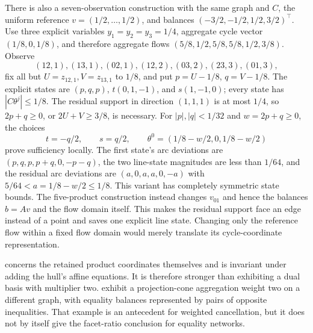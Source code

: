 \begin{remark}\label{rem:seven-product-k4}
There is also a seven-observation construction with the same graph and
$C$, the uniform reference $v=(1/2,\ldots,1/2)$, and balances
$(-3/2,-1/2,1/2,3/2)^\top$. Use three explicit variables
$y_1=y_2=y_3=1/4$, aggregate cycle vector $(1/8,0,1/8)$, and therefore
aggregate flows $(5/8,1/2,5/8,5/8,1/2,3/8)$. Observe
\[
 (12,1),(13,1),(02,1),(12,2),(03,2),(23,3),(01,3),
\]
fix all but $U=z_{12,1},V=z_{13,1}$ to $1/8$, and put
$p=U-1/8$, $q=V-1/8$. The explicit states are
$(p,q,p)$, $t(0,1,-1)$, and $s(1,-1,0)$; every state has
$|C\theta^j|\le1/8$. The residual support in direction $(1,1,1)$
is at most $1/4$, so $2p+q\ge0$, or $2U+V\ge3/8$, is necessary.
For $|p|,|q|<1/32$ and $w=2p+q\ge0$, the choices
\[
 t=-q/2,\qquad s=q/2,\qquad
 \theta^0=(1/8-w/2,0,1/8-w/2)
\]
prove sufficiency locally. The first state's arc deviations are
$(p,q,p,p+q,0,-p-q)$, the two line-state magnitudes are less than
$1/64$, and the residual arc deviations are $(a,0,a,a,0,-a)$ with
$5/64<a=1/8-w/2\le1/8$. This variant has completely symmetric state
bounds. The five-product construction instead changes $v_{01}$ and hence
the balances $b=Av$ and the flow domain itself. This makes the residual
support face an edge instead of a point and saves one explicit line state.
Changing only the reference flow within a fixed flow domain would merely
translate its cycle-coordinate representation.
\end{remark}

 concerns the retained product coordinates
themselves and is invariant under adding the hull's affine equations. It
is therefore stronger than exhibiting a dual basis with multiplier two.
\citet[Example~2]{KhademniaDavarnia2025} exhibit a projection-cone
aggregation weight two on a different graph, with equality balances
represented by pairs of opposite inequalities. That example is an
antecedent for weighted cancellation, but it does not by itself give the
facet-ratio conclusion for equality networks.
